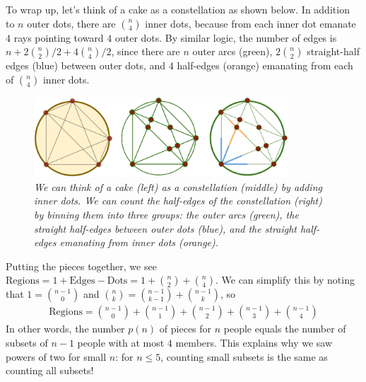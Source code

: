 \documentclass[openany, notitlepage, justified]{tufte-book}
\begin{document}
            To wrap up, let's think of a cake as a constellation as shown
            below.  In addition to $n$ outer dots, there are ${n \choose 4}$
            inner dots, because from each inner dot emanate $4$ rays pointing
            toward $4$ outer dots.  By similar logic, the number of edges is $n
            + 2{n\choose 2}/2 + 4{n \choose 4}/2$, since there are $n$ outer
            arcs (green), $2{n\choose 2}$ straight-half edges (blue) between
            outer dots, and $4$ half-edges (orange) emanating from each of
            ${n\choose 4}$ inner dots.
            \begin{figure}[h!]
                \centering
                \includegraphics[height=3cm]{count}
                \caption{\emph{
                    We can think of a cake (left)
                    as a constellation (middle) by adding inner dots.
                    We can count the half-edges of the constellation (right) 
                    by binning them into three groups: the outer arcs (green),
                    the straight half-edges between outer dots (blue), and the
                    straight half-edges emanating from inner dots (orange).
                }}
            \end{figure}

            \noindent
            Putting the pieces together, we see
            $
                \text{Regions} = 1 + \text{Edges} - \text{Dots}
                               = 1 + {n\choose 2} + {n\choose 4}
            $.
            We can simplify this by noting that $1={n-1 \choose 0}$ and ${n
            \choose k} = {n-1 \choose k-1} + {n-1 \choose k}$, so
            \begin{align*}
                \text{Regions}
                              = {n-1 \choose 0}
                              + {n-1 \choose 1}
                              + {n-1 \choose 2}
                              + {n-1 \choose 3}
                              + {n-1 \choose 4}
            \end{align*}
            In other words, the number $p(n)$ of pieces for $n$ people equals
            the number of subsets of $n-1$ people with at most $4$ members.
            This explains why we saw powers of two for small $n$: for $n\leq 5$,
            counting small subsets is the same as counting all subsets!
 
\end{document}

